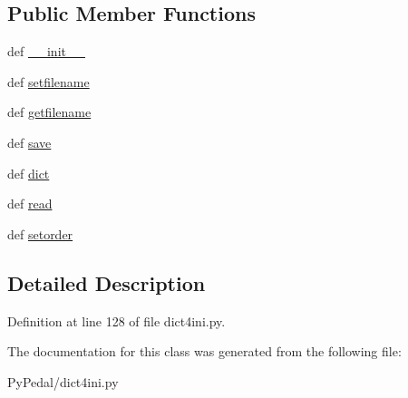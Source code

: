\subsection*{Public Member Functions}
\begin{CompactItemize}
\item 
\hypertarget{classPyPedal_1_1dict4ini_1_1DictIni_7a105aa3e61439b0017313b3af313344}{
def \hyperlink{classPyPedal_1_1dict4ini_1_1DictIni_7a105aa3e61439b0017313b3af313344}{\_\-\_\-init\_\-\_\-}}
\label{classPyPedal_1_1dict4ini_1_1DictIni_7a105aa3e61439b0017313b3af313344}

\item 
\hypertarget{classPyPedal_1_1dict4ini_1_1DictIni_8454596742402e9faa4a1c0281e078d1}{
def \hyperlink{classPyPedal_1_1dict4ini_1_1DictIni_8454596742402e9faa4a1c0281e078d1}{setfilename}}
\label{classPyPedal_1_1dict4ini_1_1DictIni_8454596742402e9faa4a1c0281e078d1}

\item 
\hypertarget{classPyPedal_1_1dict4ini_1_1DictIni_186abae52b00db0edfe5071bd66fc007}{
def \hyperlink{classPyPedal_1_1dict4ini_1_1DictIni_186abae52b00db0edfe5071bd66fc007}{getfilename}}
\label{classPyPedal_1_1dict4ini_1_1DictIni_186abae52b00db0edfe5071bd66fc007}

\item 
\hypertarget{classPyPedal_1_1dict4ini_1_1DictIni_ed1ba076dcd1499b4751790dadab9c0a}{
def \hyperlink{classPyPedal_1_1dict4ini_1_1DictIni_ed1ba076dcd1499b4751790dadab9c0a}{save}}
\label{classPyPedal_1_1dict4ini_1_1DictIni_ed1ba076dcd1499b4751790dadab9c0a}

\item 
\hypertarget{classPyPedal_1_1dict4ini_1_1DictIni_da270a25cf186876ee71130a7dc509be}{
def \hyperlink{classPyPedal_1_1dict4ini_1_1DictIni_da270a25cf186876ee71130a7dc509be}{dict}}
\label{classPyPedal_1_1dict4ini_1_1DictIni_da270a25cf186876ee71130a7dc509be}

\item 
\hypertarget{classPyPedal_1_1dict4ini_1_1DictIni_e28f235f2a1f02115dbaff8e6074ecc3}{
def \hyperlink{classPyPedal_1_1dict4ini_1_1DictIni_e28f235f2a1f02115dbaff8e6074ecc3}{read}}
\label{classPyPedal_1_1dict4ini_1_1DictIni_e28f235f2a1f02115dbaff8e6074ecc3}

\item 
\hypertarget{classPyPedal_1_1dict4ini_1_1DictIni_500d038c4331c6a8c9d8db62e2cabce1}{
def \hyperlink{classPyPedal_1_1dict4ini_1_1DictIni_500d038c4331c6a8c9d8db62e2cabce1}{setorder}}
\label{classPyPedal_1_1dict4ini_1_1DictIni_500d038c4331c6a8c9d8db62e2cabce1}

\end{CompactItemize}


\subsection{Detailed Description}


Definition at line 128 of file dict4ini.py.

The documentation for this class was generated from the following file:\begin{CompactItemize}
\item 
PyPedal/dict4ini.py\end{CompactItemize}
